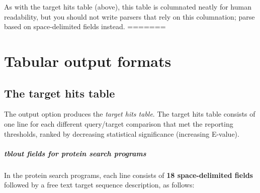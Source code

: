 As with the target hits table (above), this table is columnated neatly
for human readability, but you should not write parsers that rely on
this columnation; parse based on space-delimited fields instead.
=======
\chapter{Tabular output formats}
\label{chapter:tabular}
\setcounter{footnote}{0}

\section{The target hits table}

The  output option produces the \emph{target hits
  table}.  The target hits table consists of one line for each
different query/target comparison that met the reporting thresholds,
ranked by decreasing statistical significance (increasing E-value).


\paragraph{tblout fields for protein search programs}

In the protein search programs, each line consists of \textbf{18
space-delimited fields} followed by a free text target sequence description, as
follows:

